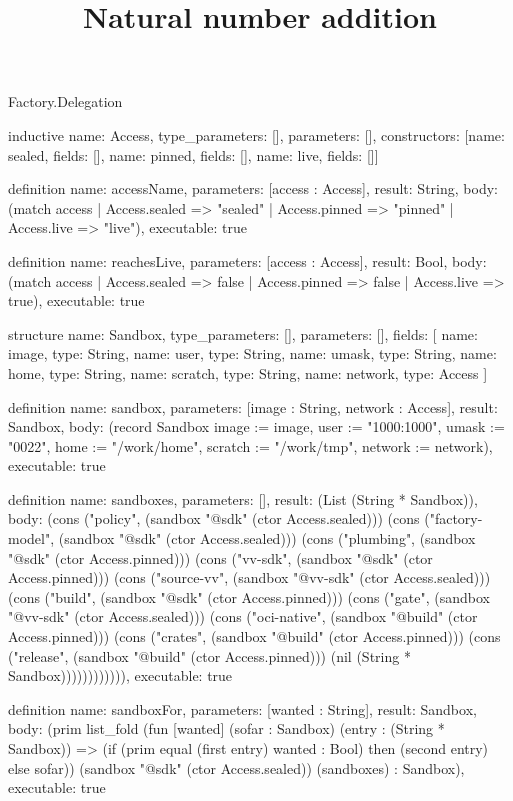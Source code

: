 \begin{lexlean}{Factory.Delegation}
\title{Natural number addition}
\begin{semanticmodule}
inductive{
  name: Access,
  type_parameters: [],
  parameters: [],
  constructors: [{name: sealed, fields: []}, {name: pinned, fields: []}, {name: live, fields: []}]
}

definition{
  name: accessName,
  parameters: [access : Access],
  result: String,
  body: (match access
    | Access.sealed => "sealed"
    | Access.pinned => "pinned"
    | Access.live => "live"),
  executable: true
}

definition{
  name: reachesLive,
  parameters: [access : Access],
  result: Bool,
  body: (match access
    | Access.sealed => false
    | Access.pinned => false
    | Access.live => true),
  executable: true
}

structure{
  name: Sandbox,
  type_parameters: [],
  parameters: [],
  fields: [
    {name: image, type: String},
    {name: user, type: String},
    {name: umask, type: String},
    {name: home, type: String},
    {name: scratch, type: String},
    {name: network, type: Access}
  ]
}

definition{
  name: sandbox,
  parameters: [image : String, network : Access],
  result: Sandbox,
  body: (record Sandbox {image := image, user := "1000:1000", umask := "0022", home := "/work/home", scratch := "/work/tmp", network := network}),
  executable: true
}

definition{
  name: sandboxes,
  parameters: [],
  result: (List (String * Sandbox)),
  body: (cons ("policy", (sandbox "@sdk" (ctor Access.sealed))) (cons ("factory-model", (sandbox "@sdk" (ctor Access.sealed))) (cons ("plumbing", (sandbox "@sdk" (ctor Access.pinned))) (cons ("vv-sdk", (sandbox "@sdk" (ctor Access.pinned))) (cons ("source-vv", (sandbox "@vv-sdk" (ctor Access.sealed))) (cons ("build", (sandbox "@sdk" (ctor Access.pinned))) (cons ("gate", (sandbox "@vv-sdk" (ctor Access.sealed))) (cons ("oci-native", (sandbox "@build" (ctor Access.pinned))) (cons ("crates", (sandbox "@build" (ctor Access.pinned))) (cons ("release", (sandbox "@build" (ctor Access.pinned))) (nil (String * Sandbox)))))))))))),
  executable: true
}

definition{
  name: sandboxFor,
  parameters: [wanted : String],
  result: Sandbox,
  body: (prim list_fold (fun [wanted] (sofar : Sandbox) (entry : (String * Sandbox)) => (if (prim equal (first entry) wanted : Bool) then (second entry) else sofar)) (sandbox "@sdk" (ctor Access.sealed)) (sandboxes) : Sandbox),
  executable: true
}


\end{semanticmodule}
\end{lexlean}
